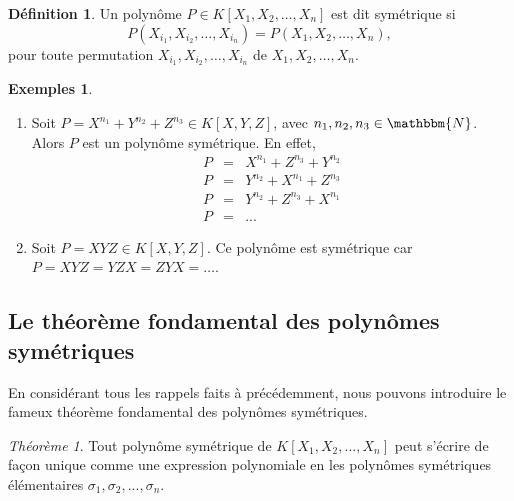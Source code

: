 \documentclass[12pt]{article}
\theoremstyle{remark}\newtheorem{note}{Note}
\theoremstyle{remark}\newtheorem{nota}{Notation}
\newtheorem{theorem}{Théorème}
\theoremstyle{definition}
\newtheorem{definition}{Définition}
\newtheorem*{examples}{Exemples}
\begin{document}

\begin{definition}
Un polynôme $P \in K\left[ X_1, X_2, \ldots , X_n \right] $ est dit symétrique si $$P(X_{i_1}, X_{i_2}, \ldots , X_{i_n}) = P(X_1,X_2,\ldots ,X_n),$$ pour toute permutation $X_{i_1}, X_{i_2}, \ldots , X_{i_n}$ de $X_1,X_2, \ldots ,X_n$.
\end{definition}
\vspace{12pt}
\begin{examples}
\begin{enumerate}
	\item Soit $P = X^{n_1} + Y^{n_2} + Z^{n_3}\in K\left[ X,Y,Z\right]$, avec $n_1,n_2,n_3 \in \mathbbm{N}$. Alors $P$ est un polynôme symétrique. En effet, 
		\begin{eqnarray}
P &=& X^{n_1} + Z^{n_3} + Y^{n_2} \nonumber \\
P &=& Y^{n_2} + X^{n_1} + Z^{n_3} \nonumber \\
P &=& Y^{n_2} + Z^{n_3} + X^{n_1} \nonumber \\
P &=& ... \nonumber
		\end{eqnarray}
		
	\item Soit $P = XYZ \in K\left[ X,Y,Z\right]$. Ce polynôme est symétrique car $P = XYZ = YZX = ZYX = \ldots$.
\end{enumerate}

\end{examples}

\subsection{Le théorème fondamental des polynômes symétriques}
En considérant tous les rappels faits à précédemment, nous pouvons introduire le fameux théorème fondamental des polynômes symétriques.

\begin{theorem}
Tout polynôme symétrique de $K\left[ X_1, X_2, ... , X_n \right]$ peut s'écrire de façon unique comme une expression polynomiale en les polynômes symétriques élémentaires $\sigma_1, \sigma_2,..., \sigma_n$.
\end{theorem}
\end{document}
